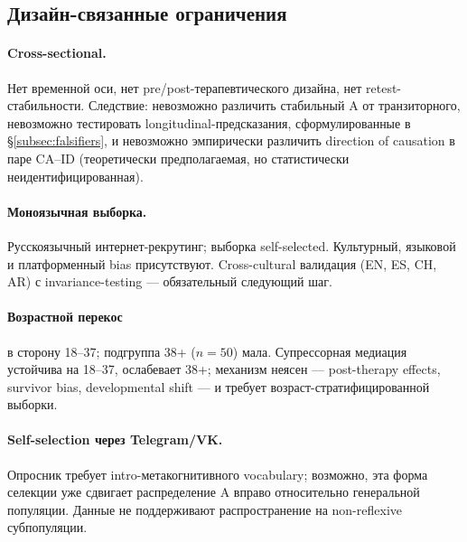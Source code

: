 \subsection{Дизайн-связанные ограничения}

\paragraph{Cross-sectional.} Нет временной оси, нет pre/post-терапевтического дизайна, нет retest-стабильности. Следствие: невозможно различить стабильный A от транзиторного, невозможно тестировать longitudinal-предсказания, сформулированные в §\ref{subsec:falsifiers}, и невозможно эмпирически различить direction of causation в паре CA--ID (теоретически предполагаемая, но статистически неидентифицированная).

\paragraph{Моноязычная выборка.} Русскоязычный интернет-рекрутинг; выборка self-selected. Культурный, языковой и платформенный bias присутствуют. Cross-cultural валидация (EN, ES, CH, AR) с invariance-testing --- обязательный следующий шаг.

\paragraph{Возрастной перекос} в сторону 18--37; подгруппа 38+ ($n = 50$) мала. Супрессорная медиация устойчива на 18--37, ослабевает 38+; механизм неясен --- post-therapy effects, survivor bias, developmental shift --- и требует возраст-стратифицированной выборки.

\paragraph{Self-selection через Telegram/VK.} Опросник требует intro-метакогнитивного vocabulary; возможно, эта форма селекции уже сдвигает распределение A вправо относительно генеральной популяции. Данные не поддерживают распространение на non-reflexive субпопуляции.

